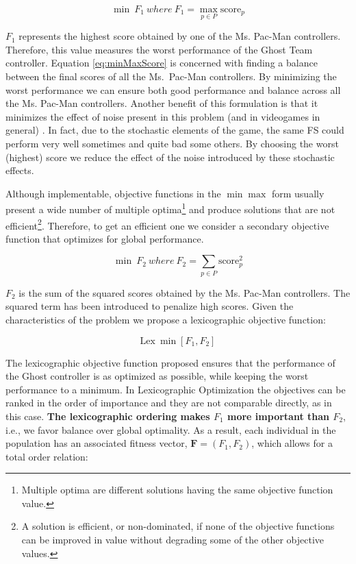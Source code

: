 \documentclass[journal]{IEEEtran}
\begin{document}
\begin{equation}
\label{eq:minMaxScore}
	\min \: F_1 \: where \: F_1 = \max_{p \in P} \text{score}_p
\end{equation}

$F_1$ represents the highest score obtained by one of the Ms. Pac-Man controllers. Therefore, this value measures the worst performance of the Ghost Team controller. Equation \eqref{eq:minMaxScore} is concerned with finding a balance between the final scores of all the Ms.\  Pac-Man controllers. By minimizing the worst performance we can ensure both good performance and balance across all the Ms. Pac-Man controllers. Another benefit of this formulation is that it minimizes the effect of noise present in this problem (and in videogames in general) \cite{Mora12}. In fact, due to the stochastic elements of the game, the same FS could perform very well sometimes and quite bad some others. By choosing the worst (highest) score we reduce the effect of the noise introduced by these stochastic effects.

Although implementable, objective functions in the $\min \max$ form usually present a wide number of multiple optima\footnote{Multiple optima are different solutions having the same objective function value.} and produce solutions that are not efficient\footnote{A solution is efficient, or non-dominated, if none of the objective functions can be improved in value without degrading some of the other objective values.}. Therefore, to get an efficient one we consider a secondary objective function that optimizes for global performance.

\begin{equation}
\label{eq:minSquareScore}
	\min \: F_2 \: where \: F_2 = \sum_{p \in P} \text{score}_p^2
\end{equation}

$F_2$ is the sum of the squared scores obtained by the Ms. Pac-Man controllers. The squared term has been introduced to penalize high scores. Given the characteristics of the problem we propose a lexicographic objective function:

\begin{equation}
\label{eq:lexicographic}
	\text{Lex} \: \min [F_1,F_2]
\end{equation}

The lexicographic objective function proposed ensures that the performance of the Ghost controller is as optimized as possible, while keeping the worst performance to a minimum. In Lexicographic Optimization \cite{Dylan2010} the objectives can be ranked in the order of importance and they are not comparable directly, as in this case. \textbf{The lexicographic ordering makes $F_1$ more important than $F_2$}, i.e., we favor balance over global optimality. As a result, each individual in the population has an associated fitness vector, $\mathbf{F}=(F_1,F_2)$, which allows for a total order relation:
\end{document}

